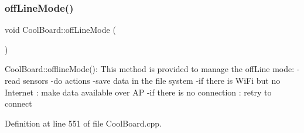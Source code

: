 \subsubsection{\texorpdfstring{off\+Line\+Mode()}{offLineMode()}}
{\footnotesize\ttfamily void Cool\+Board\+::off\+Line\+Mode (\begin{DoxyParamCaption}{ }\end{DoxyParamCaption})}

Cool\+Board\+::offline\+Mode()\+: This method is provided to manage the off\+Line mode\+: -\/read sensors -\/do actions -\/save data in the file system -\/if there is Wi\+Fi but no Internet \+: make data available over AP -\/if there is no connection \+: retry to connect 

Definition at line 551 of file Cool\+Board.\+cpp.


